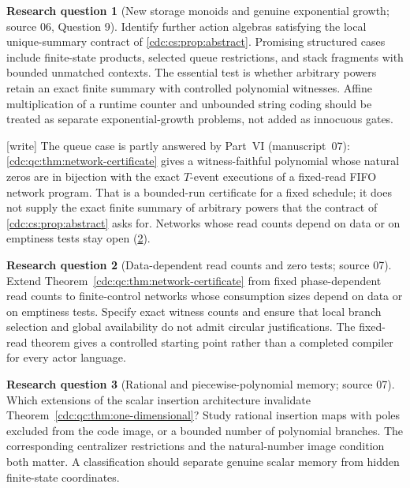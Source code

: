 \documentclass[11pt,a4paper]{article}
\theoremstyle{definition}
\newtheorem{question}[question]{Research question}
\theoremstyle{remark}
\newcommand{\wtag}{\textup{[write]}}%
\begin{document}
\begin{question}[New storage monoids and genuine exponential growth; source 06, Question 9]\label{cdc:q:storage}
Identify further action algebras satisfying the local
unique-summary contract of \cref{cdc:cs:prop:abstract}. Promising structured cases
include finite-state products, selected queue restrictions, and stack
fragments with bounded unmatched contexts. The essential test is whether
arbitrary powers retain an exact finite summary with controlled polynomial
witnesses. Affine multiplication of a runtime counter and unbounded string
coding should be treated as separate exponential-growth problems, not added
as innocuous gates.
\end{question}

\wtag{} The queue case is partly answered by Part~VI (manuscript~07):
\cref{cdc:qc:thm:network-certificate} gives a witness-faithful
polynomial whose natural zeros are in bijection with the exact $T$-event
executions of a fixed-read FIFO network program. That is a bounded-run
certificate for a fixed schedule; it does not supply the exact finite
summary of arbitrary powers that the contract of
\cref{cdc:cs:prop:abstract} asks for. Networks whose read counts depend on
data or on emptiness tests stay open (\cref{cdc:q:readcounts}).

\begin{question}[Data-dependent read counts and zero tests; source 07]\label{cdc:q:readcounts}
Extend Theorem~\ref{cdc:qc:thm:network-certificate} from fixed phase-dependent read counts to finite-control networks whose consumption sizes depend on data or on emptiness tests. Specify exact witness counts and ensure that local branch selection and global availability do not admit circular justifications. The fixed-read theorem gives a controlled starting point rather than a completed compiler for every actor language.
\end{question}

\begin{question}[Rational and piecewise-polynomial memory; source 07]
Which extensions of the scalar insertion architecture invalidate Theorem~\ref{cdc:qc:thm:one-dimensional}? Study rational insertion maps with poles excluded from the code image, or a bounded number of polynomial branches. The corresponding centralizer restrictions and the natural-number image condition both matter. A classification should separate genuine scalar memory from hidden finite-state coordinates.
\end{question}
\end{document}
